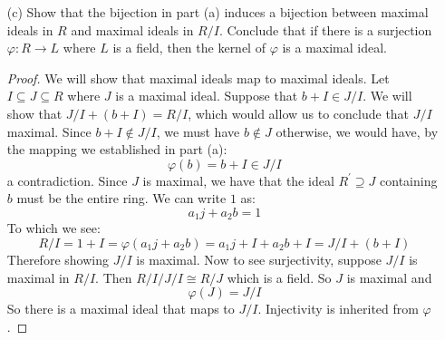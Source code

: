 \documentclass{article}
\begin{document}
\begin{itemize}
        \item [(c)] Show that the bijection in part (a) induces a bijection between maximal ideals in $R$ and maximal ideals in $R/I$. Conclude that if there is a surjection $\varphi: R \rightarrow L$ where $L$ is a field, then the kernel of $\varphi$ is a maximal ideal. 
            \begin{proof}
                We will show that maximal ideals map to maximal ideals. Let $I \subseteq J \subseteq R$ where $J$ is a maximal ideal. Suppose that $b + I \in J/I$. We will show that $J/I + (b + I) = R/I$, which would allow us to conclude that $J/I$ maximal. Since $b + I \notin J/I$, we must have $b \notin J$ otherwise, we would have, by the mapping we established in part (a):
                    \begin{equation*}
                        \varphi(b) = b + I \in J/I
                    \end{equation*}
                a contradiction. Since $J$ is maximal, we have that the ideal $R^{\prime} \supseteq J$ containing $b$ must be the entire ring. We can write $1$ as:
                    \begin{equation*}
                        a_{1}j + a_{2}b = 1
                    \end{equation*}
                To which we see:
                    \begin{equation*}
                        R/I = 1 + I = \varphi(a_{1}j + a_{2}b) = a_{1}j + I + a_{2}b + I = J/I + (b + I)
                    \end{equation*}
                Therefore showing $J/I$ is maximal. Now to see surjectivity, suppose $J/I$ is maximal in $R/I$. Then $R/I/J/I \cong R/J$ which is a field. So $J$ is maximal and 
                    \begin{equation*}
                        \varphi(J) = J/I
                    \end{equation*}
                So there is a maximal ideal that maps to $J/I$. Injectivity is inherited from $\varphi$.
            \end{proof}
    \end{itemize}
\end{document}
